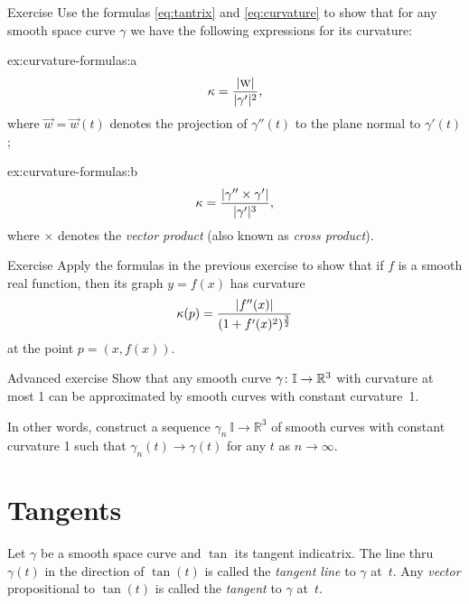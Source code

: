 \begin{thm}{Exercise}\label{ex:curvature-formulas}
Use the formulas \ref{eq:tantrix} and \ref{eq:curvature} to show that 
for any smooth space curve $\gamma$ we have the following expressions for its curvature:
\setlength{\columnseprule}{0.4pt}
\begin{multicols}{2}

\begin{subthm}{ex:curvature-formulas:a} 
\[\kappa=\frac{|\text{\sc{w}}|}{|\gamma'|^2},\]
where $\vec w=\vec w(t)$ denotes the projection of $\gamma''(t)$ to the plane normal to $\gamma'(t)$;
\end{subthm}

\begin{subthm}{ex:curvature-formulas:b}
\[\kappa=\frac{|\gamma''\times \gamma'|}{|\gamma'|^{3}},\]
where $\times$ denotes the \emph{vector product} (also known as \emph{cross product}).
\end{subthm}
\end{multicols}
\end{thm}


\begin{thm}{Exercise}\label{ex:curvature-graph}
Apply the formulas in the previous exercise to show that if $f$ is a smooth real function,
then its graph $y=f(x)$  has curvature
\[\kappa(p)=\frac{|f''(x)|}{(1+f'(x)^2)^{\frac32}}\]
at the point $p=(x,f(x))$.
\end{thm}

\begin{thm}{Advanced exercise}\label{ex:approximation-const-curvature}
Show that any smooth curve $\gamma\:\mathbb{I}\z\to\mathbb{R}^3$ with curvature at most 1 can be approximated by smooth curves with constant curvature~1.

In other words, construct a sequence $\gamma_n\:\mathbb{I}\to\mathbb{R}^3$ of smooth curves  with constant curvature 1 such that $\gamma_n(t)\to \gamma(t)$ for any $t$ as $n\to\infty$.
\end{thm}

\section{Tangents}

Let $\gamma$ be a smooth space curve and $\tan$ its tangent indicatrix.
The line thru $\gamma(t)$ in the direction of $\tan(t)$ is called the \emph{tangent line} to $\gamma$  at~$t$.
Any \emph{vector} propositional to $\tan(t)$ is called the \emph{tangent} to $\gamma$  at~$t$.

